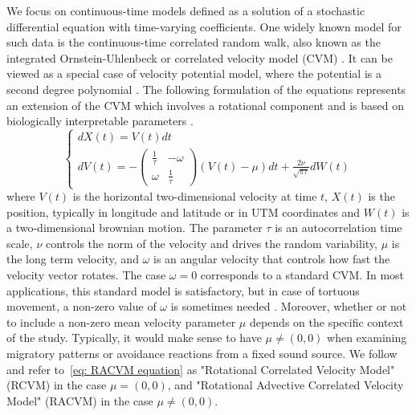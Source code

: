 \documentclass[11pt]{article}
\newcommand {\1}{\mathbb{1}}
\theoremstyle{definition}
\theoremstyle{remark}
\theoremstyle{remark}
\begin{document}
We focus on continuous-time models defined as a solution of a stochastic differential equation with time-varying coefficients. One widely known model for such data is the continuous-time correlated random walk, also known as the integrated Ornstein-Uhlenbeck or correlated velocity model (CVM) \cite{johnson_continuoustime_2008}. It can be viewed as a special case of velocity potential model, where the potential is a second degree polynomial \cite{preisler_analyzing_2013}. The following formulation of the equations represents an extension of the CVM which involves a rotational component and  is based on biologically interpretable parameters \cite{gurarie_correlated_2017}.
\begin{equation} \left\{
	\begin{array}{l}
		dX(t)=V(t)dt \\
		dV(t)=-\begin{pmatrix} 
			\frac{1}{\tau} & -\omega \\
			\omega & \frac{1}{\tau}
		\end{pmatrix}(V(t)-\mu)dt+\frac{2\nu}{\sqrt{\pi \tau}} dW(t) 
	\end{array}
	\right.
	\label{eq: RACVM equation}
\end{equation}
where $V(t)$ is the horizontal two-dimensional velocity at time $t$, $X(t)$ is the position, typically in longitude and latitude or in UTM coordinates and $W(t)$ is a two-dimensional brownian motion. 
The parameter $\tau$ is an autocorrelation time scale, $\nu$ controls the norm of the velocity and drives the random variability, $\mu$ is the long term velocity, and $\omega$ is an angular velocity that controls how fast the velocity vector rotates. The case $\omega=0$ corresponds to a standard CVM. In most applications, this standard model is satisfactory, but in case of tortuous movement, a non-zero value of $\omega$ is sometimes needed \cite{gurarie_correlated_2017,alt_correlation_1990,albertsen_generalizing_2018}. Moreover, whether or not to include a non-zero mean velocity parameter $\mu$ depends on the specific context of the study. Typically, it would make sense to have $\mu\neq (0,0)$ when examining migratory patterns or avoidance reactions from a fixed sound source. We follow \cite{gurarie_correlated_2017} and refer to~\eqref{eq: RACVM equation} as "Rotational Correlated Velocity Model" (RCVM) in the case $\mu=(0,0)$, and "Rotational Advective Correlated Velocity Model" (RACVM) in the case $\mu \neq (0,0)$.\\
\end{document}
